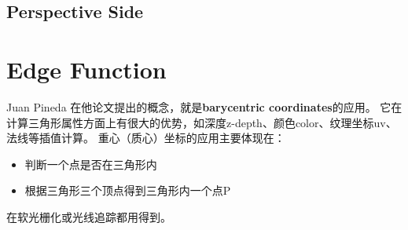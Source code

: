 \subsection{Perspective Side}



\section{ Edge Function }
Juan Pineda \cite{EdgeFunction} 在他论文提出的概念，就是\textbf{barycentric coordinates}的应用。
它在计算三角形属性方面上有很大的优势，如深度z-depth、颜色color、纹理坐标uv、法线等插值计算。
重心（质心）坐标的应用主要体现在：
\begin {itemize}
    \item {判断一个点是否在三角形内}
    \item {根据三角形三个顶点得到三角形内一个点P}
\end {itemize}
在软光栅化或光线追踪都用得到。

